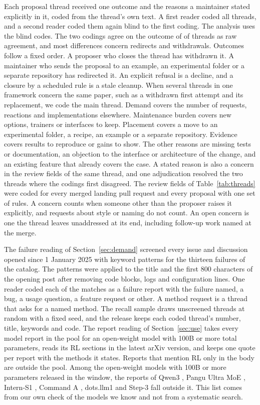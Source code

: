 \documentclass{article}
\begin{document}
Each proposal thread received one outcome and the reasons a maintainer stated explicitly in it, coded from the thread's own text. A first reader coded all threads, and a second reader coded them again blind to the first coding. The analysis uses the blind codes. The two codings agree on the outcome of \AgreeOutcome{} of \AgreeThreads{} threads as raw agreement, and most differences concern redirects and withdrawals. Outcomes follow a fixed order. A proposer who closes the thread has withdrawn it. A maintainer who sends the proposal to an example, an experimental folder or a separate repository has redirected it. An explicit refusal is a decline, and a closure by a scheduled rule is a stale cleanup. When several threads in one framework concern the same paper, such as a withdrawn first attempt and its replacement, we code the main thread. Demand covers the number of requests, reactions and implementations elsewhere. Maintenance burden covers new options, trainers or interfaces to keep. Placement covers a move to an experimental folder, a recipe, an example or a separate repository. Evidence covers results to reproduce or gains to show. The other reasons are missing tests or documentation, an objection to the interface or architecture of the change, and an existing feature that already covers the case. A stated reason is also a concern in the review fields of the same thread, and one adjudication resolved the two threads where the codings first disagreed. The review fields of Table~\ref{tab:threads} were coded for every merged landing pull request and every proposal with one set of rules. A concern counts when someone other than the proposer raises it explicitly, and requests about style or naming do not count. An open concern is one the thread leaves unaddressed at its end, including follow-up work named at the merge.

The failure reading of Section~\ref{sec:demand} screened every issue and discussion opened since 1 January 2025 with keyword patterns for the thirteen failures of the catalog. The patterns were applied to the title and the first 800 characters of the opening post after removing code blocks, logs and configuration lines. One reader coded each of the \NIssueScreened{} matches as a failure report with the failure named, a bug, a usage question, a feature request or other. A method request is a thread that asks for a named method. The recall sample draws \NIssueRecall{} unscreened threads at random with a fixed seed, and the release keeps each coded thread's number, title, keywords and code. The report reading of Section~\ref{sec:use} takes every model report in the pool for an open-weight model with 100B or more total parameters, reads its RL sections in the latest arXiv version, and keeps one quote per report with the methods it states. Reports that mention RL only in the body are outside the pool. Among the open-weight models with 100B or more parameters released in the window, the reports of Qwen3 \citep{arxiv250509388}, Pangu Ultra MoE \citep{arxiv250504519}, Intern-S1 \citep{arxiv250815763}, Command A \citep{arxiv250400698}, dots.llm1 \citep{arxiv250605767} and Step-3 \citep{arxiv250719427} fall outside it. This list comes from our own check of the models we know and not from a systematic search.
\end{document}
